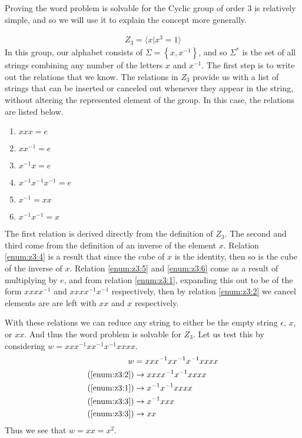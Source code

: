 \documentclass[10pt]{amsart}
\theoremstyle{definition}
\begin{document}
Proving the word problem is solvable for the Cyclic group of order 3 is
relatively simple, and so we will use it to explain the concept more generally.

\begin{align}
  Z_3=\langle x \vert x^3=1 \rangle
\end{align}
In this group, our alphabet consists of $\Sigma=\left\{x,x^{-1}\right\}$, and
so $\Sigma^*$ is the set of all strings combining any number of the letters $x$
and $x^{-1}$. The first step is to write out the relations that we know. The
relations in $Z_3$ provide us with a list of strings that can be inserted or
canceled out whenever they appear in the string, without altering the
represented element of the group. In this case, the relations are listed below.
\begin{multicols}{2}
  \begin{enumerate}
    \item $xxx= e$\label{enum:z3:1}
    \item $xx^{-1}= e$\label{enum:z3:2}
    \item $x^{-1}x= e$\label{enum:z3:3}
    \item $x^{-1}x^{-1}x^{-1}= e$\label{enum:z3:4}
    \item $x^{-1}= xx$\label{enum:z3:5}
    \item $x^{-1}x^{-1}= x$\label{enum:z3:6}
  \end{enumerate}
\end{multicols}
The first relation is derived directly from the definition of $Z_3$. The second
and third come from the definition of an inverse of the element $x$. Relation
\ref{enum:z3:4} is a result that since the cube of $x$ is the identity, then so
is the cube of the inverse of $x$. Relation \ref{enum:z3:5} and \ref{enum:z3:6}
come as a result of multiplying by $e$, and from relation \ref{enum:z3:1},
expanding this out to be of the form $xxxx^{-1}$ and $xxxx^{-1}x^{-1}$
respectively, then by relation \ref{enum:z3:2} we cancel elements are are left
with $xx$ and $x$ respectively.

With these relations we can reduce any string to either be the empty string
$\epsilon$, $x$, or $xx$. And thus the word problem is solvable for $Z_3$. Let
us test this by considering $w=xxx^{-1}xx^{-1}x^{-1}xxxx$.
\begin{align*}
  w&=xxx^{-1}xx^{-1}x^{-1}xxxx\\
  (\ref{enum:z3:2})&\rightarrow xxxx^{-1}x^{-1}xxxx\\
  (\ref{enum:z3:1})&\rightarrow x^{-1}x^{-1}xxxx\\
  (\ref{enum:z3:3})&\rightarrow x^{-1}xxx\\
  (\ref{enum:z3:3})&\rightarrow xx\\
\end{align*}
Thus we see that $w=xx=x^2$.
\end{document}
